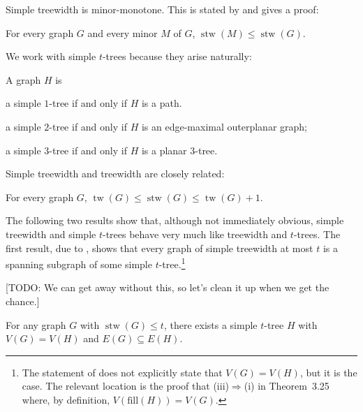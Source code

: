 \documentclass[kpfonts]{patmorin}
\DeclareMathOperator{\tw}{tw}
\DeclareMathOperator{\stw}{stw}
\theoremstyle{named}
\begin{document}
Simple treewidth is minor-monotone. This is stated by \citet{knauer.ueckerdt:simple} and \citet[Theorem~5.2]{wulf:stacked} gives a proof:

\begin{lem}\label{simple-minor-closed}
    For every graph $G$ and every minor $M$ of $G$, $\stw(M)\le\stw(G)$.
\end{lem}

We work with simple $t$-trees because they arise naturally:

\begin{lem}\label{simple-small-cases}
    A graph $H$ is
    \begin{compactenum}[(i)]
        \item a simple $1$-tree if and only if $H$ is a path.
        \item a simple $2$-tree if and only if $H$ is an edge-maximal outerplanar graph;
        \item a simple $3$-tree if and only if $H$ is a planar 3-tree.
    \end{compactenum}
\end{lem}

Simple treewidth and treewidth are closely related:

\begin{lem}\label{simple-treewidth-vs-treewidth}
    For every graph $G$, $\tw(G)\le \stw(G)\le \tw(G)+1$.
\end{lem}

The following two results show that, although not immediately obvious, simple treewidth and simple $t$-trees behave very much like treewidth and $t$-trees.  The first result, due to \citet[Theorem~3.27]{wulf:stacked}, shows that every graph of simple treewidth at most $t$ is a spanning subgraph of some simple $t$-tree.\footnote{The statement of \cite[Theorem~3.27]{wulf:stacked} does not explicitly state that $V(G)=V(H)$, but it is the case.  The relevant location is the proof that (iii)$\Rightarrow$(i) in Theorem~3.25 where, by definition, $V(\mathrm{fill}(H))=V(G)$.}

[TODO: We can get away without this, so let's clean it up when we get the chance.]
\begin{lem}\label{simple-subgraph}
    For any graph $G$ with $\stw(G)\le t$, there exists a simple $t$-tree $H$ with $V(G)= V(H)$ and $E(G)\subseteq E(H)$.
\end{lem}
\end{document}
